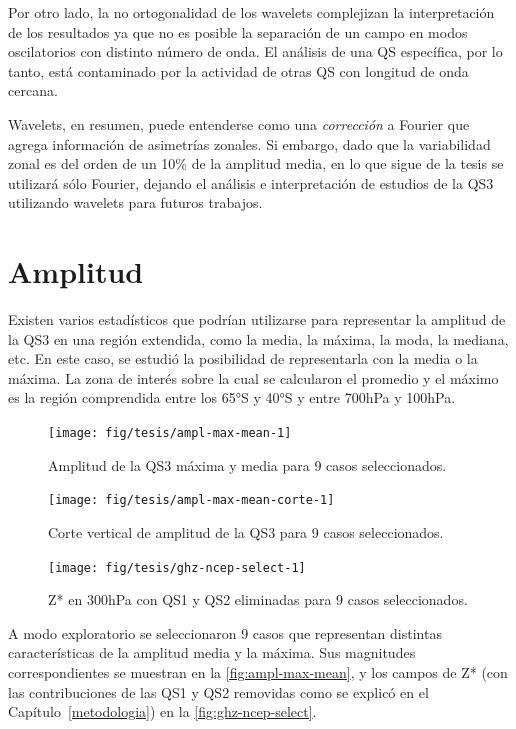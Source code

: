 \documentclass[spanish,a4paper,12pt,oneside]{book}
\begin{document}
Por otro lado, la no ortogonalidad de los wavelets complejizan la
interpretación de los resultados ya que no es posible la separación de
un campo en modos oscilatorios con distinto número de onda. El análisis
de una QS específica, por lo tanto, está contaminado por la actividad de
otras QS con longitud de onda cercana.

Wavelets, en resumen, puede entenderse como una \emph{corrección} a
Fourier que agrega información de asimetrías zonales. Si embargo, dado
que la variabilidad zonal es del orden de un 10\% de la amplitud media,
en lo que sigue de la tesis se utilizará sólo Fourier, dejando el
análisis e interpretación de estudios de la QS3 utilizando wavelets para
futuros trabajos.

\section{Amplitud}\label{amplitud}

Existen varios estadísticos que podrían utilizarse para representar la
amplitud de la QS3 en una región extendida, como la media, la máxima, la
moda, la mediana, etc. En este caso, se estudió la posibilidad de
representarla con la media o la máxima. La zona de interés sobre la cual
se calcularon el promedio y el máximo es la región comprendida entre los
65°S y 40°S y entre 700hPa y 100hPa.

\begin{figure}
\texttt{[image: fig/tesis/ampl-max-mean-1]} \caption{Amplitud de la QS3 máxima y media para 9 casos seleccionados.}\label{fig:ampl-max-mean}
\end{figure}

\begin{figure}
\texttt{[image: fig/tesis/ampl-max-mean-corte-1]} \caption{Corte vertical de amplitud de la QS3 para 9 casos seleccionados.}\label{fig:ampl-max-mean-corte}
\end{figure}

\begin{figure}
\texttt{[image: fig/tesis/ghz-ncep-select-1]} \caption{Z* en 300hPa con QS1 y QS2 eliminadas para 9 casos seleccionados.}\label{fig:ghz-ncep-select}
\end{figure}

A modo exploratorio se seleccionaron 9 casos que representan distintas
características de la amplitud media y la máxima. Sus magnitudes
correspondientes se muestran en la \autoref{fig:ampl-max-mean}, y los
campos de Z* (con las contribuciones de las QS1 y QS2 removidas como se
explicó en el Capítulo~\ref{metodologia}) en la
\autoref{fig:ghz-ncep-select}.
\end{document}

